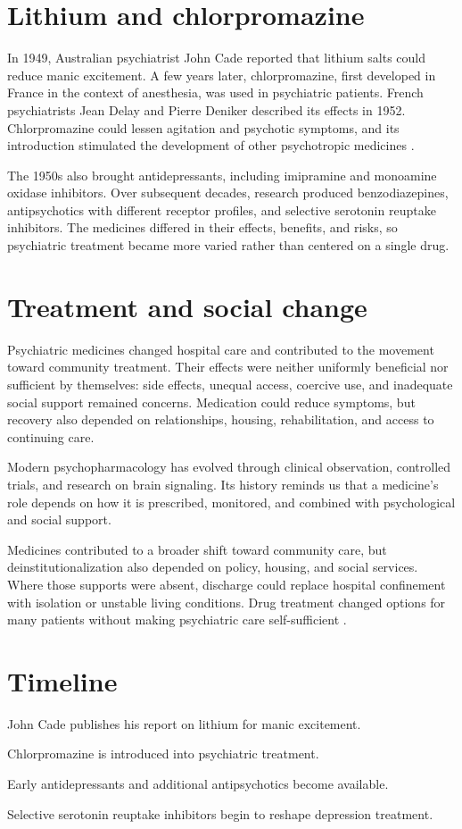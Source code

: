 \documentclass[12pt,oneside]{book}
\begin{document}
\section{Lithium and chlorpromazine}
In 1949, Australian psychiatrist John Cade reported that lithium salts could reduce manic excitement. A few years later, chlorpromazine, first developed in France in the context of anesthesia, was used in psychiatric patients. French psychiatrists Jean Delay and Pierre Deniker described its effects in 1952. Chlorpromazine could lessen agitation and psychotic symptoms, and its introduction stimulated the development of other psychotropic medicines \cite{psychopharmHistory,lithiumHistory}.

The 1950s also brought antidepressants, including imipramine and monoamine
oxidase inhibitors. Over subsequent decades, research produced
benzodiazepines, antipsychotics with different receptor profiles, and
selective serotonin reuptake inhibitors. The medicines differed in their
effects, benefits, and risks, so psychiatric treatment became more varied
rather than centered on a single drug.

\section{Treatment and social change}
Psychiatric medicines changed hospital care and contributed to the movement toward community treatment. Their effects were neither uniformly beneficial nor sufficient by themselves: side effects, unequal access, coercive use, and inadequate social support remained concerns. Medication could reduce symptoms, but recovery also depended on relationships, housing, rehabilitation, and access to continuing care.

Modern psychopharmacology has evolved through clinical observation, controlled
trials, and research on brain signaling. Its history reminds us that a
medicine's role depends on how it is prescribed, monitored, and combined with
psychological and social support.

Medicines contributed to a broader shift toward community care, but
deinstitutionalization also depended on policy, housing, and social services.
Where those supports were absent, discharge could replace hospital confinement
with isolation or unstable living conditions. Drug treatment changed options
for many patients without making psychiatric care self-sufficient
\cite{psychopharmHistory,lithiumHistory}.

\section*{Timeline}
\begin{description}[leftmargin=2.3cm,style=nextline]
  \item[1949] John Cade publishes his report on lithium for manic excitement.
  \item[1952] Chlorpromazine is introduced into psychiatric treatment.
  \item[1950s] Early antidepressants and additional antipsychotics become available.
  \item[1980s] Selective serotonin reuptake inhibitors begin to reshape depression treatment.
\end{description}
\end{document}
